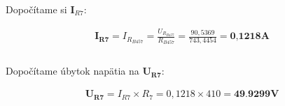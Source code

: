 \noindent Dopočítame si $\boldsymbol I_{R7}$:

\begin{gather*}
    \boldsymbol{I_{R7}} = I_{R_{B457}} = \frac{U_{R_{B457}}}{R_{B457}} =
    \frac{90,5369}{743,4454} =
    \textbf{0,1218A} \\\\
\end{gather*}

\noindent Dopočítame úbytok napätia na $\boldsymbol{U_{R7}}$:

\begin{gather*}
    \boldsymbol{U_{R7}} = I_{R7} \times R_7 = 0,1218 \times 410 = \textbf{49.9299V}
\end{gather*}






